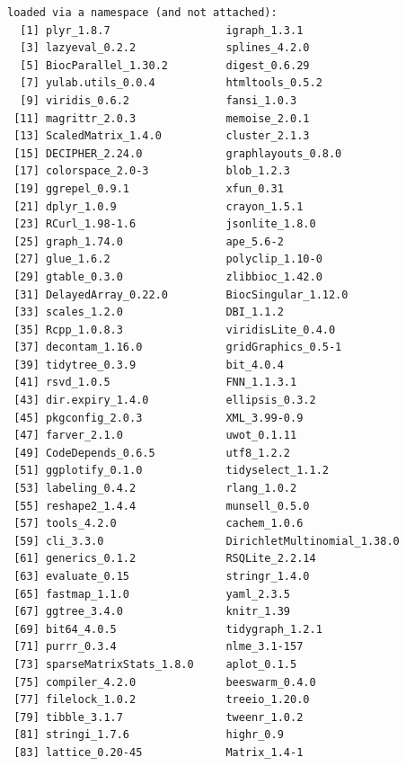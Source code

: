 \documentclass[
]{book}
\begin{document}
\begin{verbatim}
loaded via a namespace (and not attached):
  [1] plyr_1.8.7                  igraph_1.3.1               
  [3] lazyeval_0.2.2              splines_4.2.0              
  [5] BiocParallel_1.30.2         digest_0.6.29              
  [7] yulab.utils_0.0.4           htmltools_0.5.2            
  [9] viridis_0.6.2               fansi_1.0.3                
 [11] magrittr_2.0.3              memoise_2.0.1              
 [13] ScaledMatrix_1.4.0          cluster_2.1.3              
 [15] DECIPHER_2.24.0             graphlayouts_0.8.0         
 [17] colorspace_2.0-3            blob_1.2.3                 
 [19] ggrepel_0.9.1               xfun_0.31                  
 [21] dplyr_1.0.9                 crayon_1.5.1               
 [23] RCurl_1.98-1.6              jsonlite_1.8.0             
 [25] graph_1.74.0                ape_5.6-2                  
 [27] glue_1.6.2                  polyclip_1.10-0            
 [29] gtable_0.3.0                zlibbioc_1.42.0            
 [31] DelayedArray_0.22.0         BiocSingular_1.12.0        
 [33] scales_1.2.0                DBI_1.1.2                  
 [35] Rcpp_1.0.8.3                viridisLite_0.4.0          
 [37] decontam_1.16.0             gridGraphics_0.5-1         
 [39] tidytree_0.3.9              bit_4.0.4                  
 [41] rsvd_1.0.5                  FNN_1.1.3.1                
 [43] dir.expiry_1.4.0            ellipsis_0.3.2             
 [45] pkgconfig_2.0.3             XML_3.99-0.9               
 [47] farver_2.1.0                uwot_0.1.11                
 [49] CodeDepends_0.6.5           utf8_1.2.2                 
 [51] ggplotify_0.1.0             tidyselect_1.1.2           
 [53] labeling_0.4.2              rlang_1.0.2                
 [55] reshape2_1.4.4              munsell_0.5.0              
 [57] tools_4.2.0                 cachem_1.0.6               
 [59] cli_3.3.0                   DirichletMultinomial_1.38.0
 [61] generics_0.1.2              RSQLite_2.2.14             
 [63] evaluate_0.15               stringr_1.4.0              
 [65] fastmap_1.1.0               yaml_2.3.5                 
 [67] ggtree_3.4.0                knitr_1.39                 
 [69] bit64_4.0.5                 tidygraph_1.2.1            
 [71] purrr_0.3.4                 nlme_3.1-157               
 [73] sparseMatrixStats_1.8.0     aplot_0.1.5                
 [75] compiler_4.2.0              beeswarm_0.4.0             
 [77] filelock_1.0.2              treeio_1.20.0              
 [79] tibble_3.1.7                tweenr_1.0.2               
 [81] stringi_1.7.6               highr_0.9                  
 [83] lattice_0.20-45             Matrix_1.4-1               

\end{verbatim}
\end{document}
